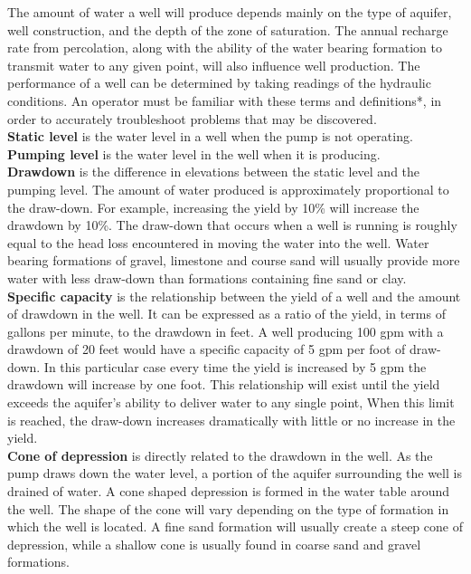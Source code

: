 The amount of water a well will produce depends mainly on the type of aquifer, well construction, and the depth of the zone of saturation. The annual recharge rate from percolation, along with the ability of the water bearing formation to transmit water to any given point, will also influence well production. The performance of a well can be determined by taking readings of the hydraulic conditions. An operator must be familiar with these terms and definitions*, in order to accurately troubleshoot problems that may be discovered.\\
\vspace{0.3cm}
\textbf{Static level }is the water level in a well when the pump is not operating.\\
\vspace{0.3cm}
\textbf{Pumping level} is the water level in the well when it is producing.\\
\vspace{0.3cm}
\textbf{Drawdown} is the difference in elevations between the static level and the pumping level. The amount of water produced is approximately proportional to the draw-down. For example, increasing the yield by 10\% will increase the drawdown by 10\%. The draw-down that occurs when a well is running is roughly equal to the head loss encountered in moving the water into the well. Water bearing formations of gravel, limestone and course sand will usually provide more water with less draw-down than formations containing fine sand or clay.\\
\vspace{0.3cm}
\textbf{Specific capacity} is the relationship between the yield of a well and the amount of drawdown in the well. It can be expressed as a ratio of the yield, in terms of gallons per minute, to the drawdown in feet. A well producing 100 gpm with a drawdown of 20 feet would have a specific capacity of 5 gpm per foot of draw-down. In this particular case every time the yield is increased by 5 gpm the drawdown will increase by one foot. This relationship will exist until the yield exceeds the aquifer’s ability to deliver water to any single point, When this limit is reached, the draw-down increases dramatically with little or no increase in the yield.\\
\vspace{0.3cm}
\textbf{Cone of depression} is directly related to the drawdown in the well. As the pump draws down the water level, a portion of the aquifer surrounding the well is drained of water. A cone shaped depression is formed in the water table around the well. The shape of the cone will vary depending on the type of formation in which the well is located. A fine sand formation will usually create a steep cone of depression, while a shallow cone is usually found in coarse sand and gravel formations.\\
